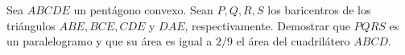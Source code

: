 Sea $ABCDE$ un pentágono convexo. Sean $P,Q,R,S$ los baricentros de los triángulos $ABE,BCE,CDE$ y $DAE$, respectivamente. Demostrar que $PQRS$ es un paralelogramo y que su área es igual a $2/9$ el área del cuadrilátero $ABCD$.
